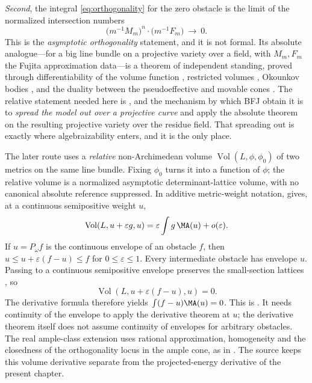 \emph{Second}, the integral \eqref{eq:orthogonality} for the zero obstacle
is the limit of the normalized intersection numbers
\begin{equation}\label{eq:ch27-asymptotic-orthogonality}
 \bigl(m^{-1}M_m\bigr)^n\cdot\bigl(m^{-1}F_m\bigr)
 \ \longrightarrow\ 0 .
\end{equation}
This is the \emph{asymptotic orthogonality} statement, and it is not formal.
Its absolute analogue---for a big line bundle on a projective variety over a
field, with $M_m,F_m$ the Fujita approximation data---is a theorem of
independent standing, proved through differentiability of the volume
function \cite{BFJ09}, restricted volumes \cite{ELMNP09}, Okounkov bodies
\cite{LM09}, and the duality between the pseudoeffective and movable cones
\cite{BDPP13}.  The relative statement needed here is
\cite[Appendix~A]{BFJ15}, and the mechanism by which BFJ obtain it is to
\emph{spread the model out over a projective curve} and apply the absolute
theorem on the resulting projective variety over the residue field.  That spreading out
is exactly where algebraizability enters, and it is the only place.

The later route uses a \emph{relative} non-Archimedean volume
$\operatorname{Vol}(L,\phi,\phi_0)$ of two metrics on the same line
bundle.  Fixing $\phi_0$ turns it into a function of $\phi$; the relative
volume is a normalized asymptotic determinant-lattice volume, with no
canonical absolute reference suppressed.  In additive metric-weight
notation, \cite[Theorem~5.4.3]{BGGJKM20} gives, at a continuous
semipositive weight $u$,
\[
 \operatorname{Vol}(L,u+\varepsilon g,u)
   =\varepsilon\int g\,\MA(u)+o(\varepsilon).
\]
If $u=P_\omega f$ is the continuous envelope of an obstacle $f$, then
$u\leq u+\varepsilon(f-u)\leq f$ for $0\leq\varepsilon\leq1$.
Every intermediate obstacle has envelope $u$.
Passing to a continuous semipositive envelope preserves the small-section
lattices \cite[Proposition~6.2.1]{BGGJKM20}, so
\[
 \operatorname{Vol}(L,u+\varepsilon(f-u),u)=0.
\]
The derivative formula therefore yields
$\int(f-u)\MA(u)=0$.  This is
\cite[Theorem~6.3.2]{BGGJKM20}.  It needs continuity of the envelope to
apply the derivative theorem at $u$; the derivative theorem itself does
not assume continuity of envelopes for arbitrary obstacles.
The real ample-class extension uses rational approximation, homogeneity
and the closedness of the orthogonality locus in the ample cone, as in
\cite[Theorem~6.3.3]{BGGJKM20}.  The source keeps this volume derivative
separate from the projected-energy derivative of the present chapter.

